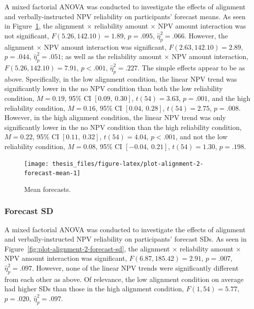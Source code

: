 \documentclass[a4paper, nobind, dvipsnames]{templates/ociamthesis}
\theoremstyle{definition}
\theoremstyle{definition}
\theoremstyle{definition}
\theoremstyle{definition}
\theoremstyle{remark}
\begin{document}
A mixed factorial ANOVA was conducted to investigate the effects of alignment
and verbally-instructed NPV reliability on participants' forecast means. As seen
in Figure~\ref{fig:plot-alignment-2-forecast-mean}, the alignment \(\times\)
reliability amount \(\times\) NPV amount interaction was not significant,
\(F(5.26, 142.10) = 1.89\), \(p = .095\), \(\hat{\eta}^2_p = .066\).
However, the alignment \(\times\) NPV amount interaction was significant,
\(F(2.63, 142.10) = 2.89\), \(p = .044\), \(\hat{\eta}^2_p = .051\); as well as the
reliability amount \(\times\) NPV amount interaction,
\(F(5.26, 142.10) = 7.91\), \(p < .001\), \(\hat{\eta}^2_p = .227\). The simple
effects appear to be as above. Specifically, in the low alignment condition, the
linear NPV trend was significantly lower in the no NPV condition than both the
low reliability condition,
\(M = 0.19\), 95\% CI \([0.09,~0.30]\), \(t(54) = 3.63\), \(p = .001\), and the high
reliability condition,
\(M = 0.16\), 95\% CI \([0.04,~0.28]\), \(t(54) = 2.75\), \(p = .008\). However, in the
high alignment condition, the linear NPV trend was only significantly lower in
the no NPV condition than the high reliability condition,
\(M = 0.22\), 95\% CI \([0.11,~0.32]\), \(t(54) = 4.04\), \(p < .001\), and not the low
reliability condition,
\(M = 0.08\), 95\% CI \([-0.04,~0.21]\), \(t(54) = 1.30\), \(p = .198\).



\begin{figure}
\texttt{[image: thesis\_files/figure-latex/plot-alignment-2-forecast-mean-1]} \caption{Mean forecasts.}\label{fig:plot-alignment-2-forecast-mean}
\end{figure}

\hypertarget{forecast-sd-alignment-2}{%
\subsubsection{Forecast SD}\label{forecast-sd-alignment-2}}

A mixed factorial ANOVA was conducted to investigate the effects of alignment
and verbally-instructed NPV reliability on participants' forecast SDs. As seen
in Figure~\ref{fig:plot-alignment-2-forecast-sd}, the alignment \(\times\)
reliability amount \(\times\) NPV amount interaction was significant,
\(F(6.87, 185.42) = 2.91\), \(p = .007\), \(\hat{\eta}^2_p = .097\).
However, none of the linear NPV trends were significantly different from each
other as above. Of relevance, the low alignment condition on average had higher
SDs than those in the high alignment condition,
\(F(1, 54) = 5.77\), \(p = .020\), \(\hat{\eta}^2_p = .097\).
\end{document}
